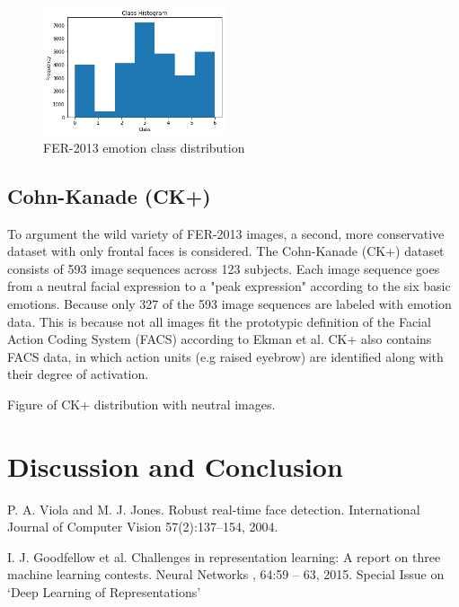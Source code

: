 \documentclass[twoside]{article}
\begin{document}
\begin{multicols}{2}
\begin{figure}[H]
	\includegraphics[width=0.48\textwidth]{class_dist}
	\caption{FER-2013 emotion class distribution}
\end{figure}

\subsection{Cohn-Kanade (CK+)}
To argument the wild variety of FER-2013 images, a second, more conservative dataset with only frontal faces is considered. The Cohn-Kanade (CK+) dataset consists of 593 image sequences across 123 subjects. Each image sequence goes from a neutral facial expression to a "peak expression" according to the six basic emotions. Because only 327 of the 593 image sequences are labeled with emotion data. This is because not all images fit the prototypic definition of the Facial Action Coding System (FACS) according to Ekman et al. CK+ also contains FACS data, in which action units (e.g raised eyebrow) are identified along with their degree of activation.

Figure of CK+ distribution with neutral images.



\section{Discussion and Conclusion}




\begin{thebibliography}{9}

  	P. A. Viola and M. J. Jones. Robust real-time face detection.
	International Journal of Computer Vision
	57(2):137–154, 2004.

	I. J. Goodfellow et al.
	Challenges in representation learning: A report on three machine
	learning contests.
	Neural Networks
	, 64:59 – 63, 2015.
	Special Issue on ‘Deep Learning of Representations’

 
\end{thebibliography}


\end{multicols}
\end{document}
